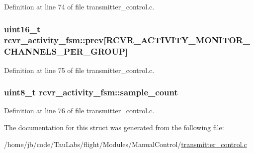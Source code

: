 \-Definition at line 74 of file transmitter\-\_\-control.\-c.

\hypertarget{structrcvr__activity__fsm_acbfbcf2f18825d85bc9c672190f3d357}{
\subsubsection[{prev}]{\setlength{\rightskip}{0pt plus 5cm}uint16\-\_\-t {\bf rcvr\-\_\-activity\-\_\-fsm\-::prev}\mbox{[}\-R\-C\-V\-R\-\_\-\-A\-C\-T\-I\-V\-I\-T\-Y\-\_\-\-M\-O\-N\-I\-T\-O\-R\-\_\-\-C\-H\-A\-N\-N\-E\-L\-S\-\_\-\-P\-E\-R\-\_\-\-G\-R\-O\-U\-P\mbox{]}}}\label{structrcvr__activity__fsm_acbfbcf2f18825d85bc9c672190f3d357}


\-Definition at line 75 of file transmitter\-\_\-control.\-c.

\hypertarget{structrcvr__activity__fsm_a68c72760513df75e420f5ed8c2046e9c}{
\subsubsection[{sample\-\_\-count}]{\setlength{\rightskip}{0pt plus 5cm}uint8\-\_\-t {\bf rcvr\-\_\-activity\-\_\-fsm\-::sample\-\_\-count}}}\label{structrcvr__activity__fsm_a68c72760513df75e420f5ed8c2046e9c}


\-Definition at line 76 of file transmitter\-\_\-control.\-c.



\-The documentation for this struct was generated from the following file\-:\begin{DoxyCompactItemize}
\item 
/home/jb/code/\-Tau\-Labs/flight/\-Modules/\-Manual\-Control/\hyperlink{transmitter__control_8c}{transmitter\-\_\-control.\-c}\end{DoxyCompactItemize}

